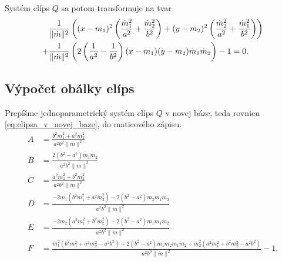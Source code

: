 Systém elíps $Q$ sa potom transformuje na tvar
\begin{align} 
\label{eq:elipsa_v_novej_baze}
&\frac{1}{\|{\dot{m}}\|^2} \left( (x - m_1)^2 \left( \frac{{\dot{m}_1}^2}{a^2} + \frac{{\dot{m}_2}^2}{b^2} \right) + (y - m_2)^2 \left( \frac{{\dot{m}_2}^2}{a^2} + \frac{{\dot{m}_1}^2}{b^2} \right) \right) \notag \\
+ &\frac{1}{\|{\dot{m}}\|^2} \left( 2\left( \frac{1}{a^2} - \frac{1}{b^2} \right)(x - m_1)(y - m_2)\dot{m}_1\dot{m}_2 \right) - 1 = 0.
\end{align}

\subsection{Výpočet obálky elíps}
Prepíšme jednoparametrický systém elíps $Q$ v novej báze, teda rovnicu \ref{eq:elipsa_v_novej_baze}, do maticového zápisu.
\begin{align*}
A &= \frac{b^2 \dot{m}_1^2 + a^2 \dot{m}_2^2}{a^2b^2 \| \dot{m} \|^2} \\
B &= \frac{2(b^2-a^2)\dot{m}_1 \dot{m}_2}{a^2b^2 \| \dot{m} \|^2} \\
C &= \frac{a^2 \dot{m}_1^2 + b^2 \dot{m}_2^2}{a^2b^2\| \dot{m} \|^2} \\
D &= \frac{- 2m_1 \left( b^2 \dot{m}_1^2 + a^2 \dot{m}_2^2 \right) - 2 \left(b^2 - a^2 \right) m_2 \dot{m}_1 \dot{m}_2 }{a^2b^2\| \dot{m} \|^2} \\
E &= \frac{- 2m_2 \left( a^2 \dot{m}_1^2 + b^2 \dot{m}_2^2 \right) - 2 \left(b^2 - a^2 \right) m_1 \dot{m}_1 \dot{m}_2 }{a^2b^2\| \dot{m} \|^2} \\
F &= \frac{\dot{m}_1^2 (b^2 m_1^2 + a^2 m_2^2 - a^2b^2) + 2 (b^2 - a^2) m_1 m_2 \dot{m}_1 \dot{m}_2 + \dot{m}_2^2 (a^2 m_1^2 + b^2 m_2^2 - a^2b^2) }{a^2b^2\| \dot{m}  \|^2}  -  1.  \\
\end{align*}

